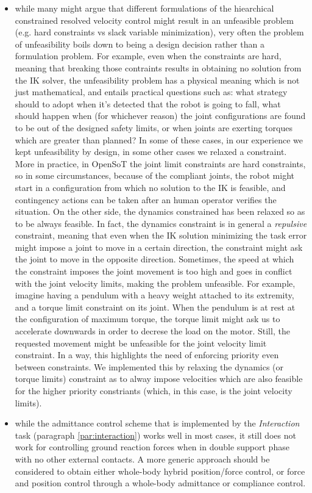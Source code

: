 \documentclass[%
	paper=A4,					%
	twoside=true,				%
	openright,			.
	parskip=full,				%
	chapterprefix=true,			%
	11pt,						%
	headings=normal,			%
	bibliography=totoc,			%
	listof=totoc,				%
	titlepage=on,				%
	captions=tableabove,		%
	draft=true,				%
]{scrreprt}%
\begin{document}
\begin{itemize}
 \item while many might argue that different formulations of the hiearchical constrained resolved velocity control might result in an unfeasible problem (e.g. hard constraints vs slack variable minimization), very often the problem  of unfeasibility boils down to being a design decision rather than a formulation problem. For example, even when the constraints are hard, meaning that breaking those contraints results in obtaining no solution from the IK solver, the unfeasibility problem has a physical meaning which is not just mathematical, and entails practical questions such as: what strategy should to adopt when it's detected that the robot is going to fall, what should happen when (for whichever reason) the joint configurations are found to be out of the designed safety limits, or when joints are exerting torques which are greater than planned? In some of these cases, in our experience we kept unfeasibility by design, in some other cases we relaxed a constraint. More in practice, in OpenSoT the joint limit constraints are hard constraints, so in some circumstances, because of the compliant joints, the robot might start in a configuration from which no solution to the IK is feasible, and contingency actions can be taken after an human operator verifies the situation. On the other side, the dynamics constrained has been relaxed so as to be always feasible. In fact, the dynamics constraint is in general a \emph{repulsive} constraint, meaning that even when the IK solution minimizing the task error might impose a joint to move in a certain direction, the constraint might ask the joint to move in the opposite direction. Sometimes, the speed at which the constraint imposes the joint movement is too high and goes in conflict with the joint velocity limits, making the problem unfeasible. For example, imagine having a pendulum with a heavy weight attached to its extremity, and a torque limit constraint on its joint. When the pendulum is at rest at the configuration of maximum torque, the torque limit might ask us to accelerate downwards in order to decrese the load on the motor. Still, the requested movement might be unfeasible for the joint velocity limit constraint. In a way, this highlights the need of enforcing priority even between constraints. We implemented this by relaxing the dynamics (or torque limits) constraint as to alway impose velocities which are also feasible for the higher priority constriants (which, in this case, is the joint velocity limits).
 \item while the admittance control scheme that is implemented by the \emph{Interaction} task (paragraph \ref{par:interaction}) works well in most cases, it still does not work for controlling ground reaction forces when in double support phase with no other external contacts. A more generic approach should be considered to obtain either whole-body hybrid position/force control, or force and position control through a whole-body admittance or compliance control.

\end{itemize}
\end{document}

